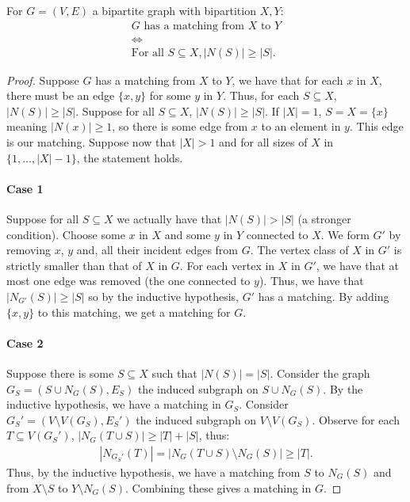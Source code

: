 For $G = (V, E)$ a bipartite graph with bipartition $X, Y$: \begin{gather*}
  G \text{ has a matching from } X \text{ to } Y \\
  \Longleftrightarrow \\
  \text{For all } S \subseteq X, |N(S)| \geq |S|.
\end{gather*}
\begin{proof}
    Suppose $G$ has a matching from $X$ to $Y$, we have that
    for each $x$ in $X$, there must be an edge $\{x, y\}$
    for some $y$ in $Y$. Thus, for each $S \subseteq X$,
    $|N(S)| \geq |S|$. Suppose for all $S \subseteq X$, 
    $|N(S)| \geq |S|$. If $|X| = 1$, $S = X = \{x\}$ meaning
    $|N(x)| \geq 1$, so there is some edge from $x$ to an
    element in $y$. This edge is our matching.
    Suppose now that $|X| > 1$ and for all sizes of $X$ in
    $\{1, \ldots, |X| - 1\}$, the statement holds.
    \paragraph{Case 1}
    Suppose for all $S \subseteq X$ we actually have that 
    $|N(S)| > |S|$ (a stronger condition). Choose some
    $x$ in $X$ and some $y$ in $Y$ connected to $X$. We
    form $G'$ by removing $x$, $y$ and, all their incident
    edges from $G$. The vertex class of $X$ in $G'$
    is strictly smaller than that of $X$ in $G$. For
    each vertex in $X$ in $G'$, we have that at most
    one edge was removed (the one connected to $y$).
    Thus, we have that $|N_{G'}(S)| \geq |S|$ so by the
    inductive hypothesis, $G'$ has a matching. By adding
    $\{x, y\}$ to this matching, we get a matching for $G$.
    \paragraph{Case 2}
    Suppose there is some $S \subseteq X$ such that $|N(S)| = |S|$.
    Consider the graph $G_S = (S \cup N_G(S), E_S)$ the induced
    subgraph on $S \cup N_G(S)$. By the inductive hypothesis,
    we have a matching in $G_S$. Consider 
    $G_S' = (V \setminus V(G_S), E_S')$ the induced subgraph on
    $V \setminus V(G_S)$. Observe for each $T \subseteq V(G_S')$,
    $|N_G(T \cup S)| \geq |T| + |S|$, thus: \begin{gather*}
        |N_{G_S'}(T)| = |N_G(T \cup S) \setminus N_G(S)| \geq |T|.
    \end{gather*} Thus, by the inductive hypothesis, we have a matching
    from $S$ to $N_G(S)$ and from $X \setminus S$ to $Y \setminus N_G(S)$.
    Combining these gives a matching in $G$. 
\end{proof}

